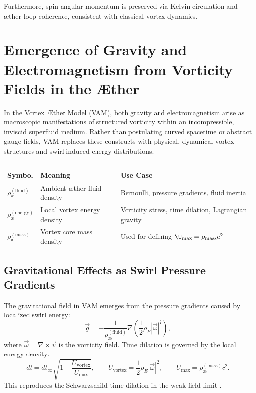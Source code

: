 \documentclass[preprint]{revtex4-2}
\begin{document}
Furthermore, spin angular momentum is preserved via Kelvin circulation and \ae ther loop coherence, consistent with classical vortex dynamics.

\section{Emergence of Gravity and Electromagnetism from Vorticity Fields in the Æther}

In the Vortex \AE ther Model (VAM), both gravity and electromagnetism arise as macroscopic manifestations of structured vorticity within an incompressible, inviscid superfluid medium. Rather than postulating curved spacetime or abstract gauge fields, VAM replaces these constructs with physical, dynamical vortex structures and swirl-induced energy distributions.


\begin{table}
    \centering
    \begin{tabular}{lll}
        \toprule
        \textbf{Symbol} & \textbf{Meaning} & \textbf{Use Case} \\
        \midrule
          \(\rho_\text{\ae}^{(\text{fluid})}\) & Ambient æther fluid density & Bernoulli, pressure gradients, fluid inertia \\
          \(\rho_\text{\ae}^{(\text{energy})}\) & Local vortex energy density & Vorticity stress, time dilation, Lagrangian gravity \\
          \(\rho_\text{\ae}^{(\text{mass})}\) & Vortex core mass density & Used for defining \(\U_{\text{max}} = \rho_\text{mass} c^2\) \\
        \bottomrule
    \end{tabular}
    \caption{}
    \label{tab:densities}
\end{table}

\subsection{Gravitational Effects as Swirl Pressure Gradients}

The gravitational field in VAM emerges from the pressure gradients caused by localized swirl energy:
\begin{equation}
\vec{g} = -\frac{1}{\rho_\text{\ae}^{(\text{fluid})}} \nabla \left( \frac{1}{2} \rho_{\scriptscriptstyle\boldsymbol\!E}|\vec{\omega}|^2 \right),
\end{equation}
where \( \vec{\omega} = \nabla \times \vec{v} \) is the vorticity field. Time dilation is governed by the local energy density:
\begin{equation}
dt = dt_\infty \sqrt{1 - \frac{U_{\text{vortex}}}{U_{\text{max}}}}, \qquad
U_{\text{vortex}} = \frac{1}{2} \rho_{\scriptscriptstyle\boldsymbol\!E}|\vec{\omega}|^2, \qquad
U_{\text{max}} = \rho_\text{\ae}^{(\text{mass})} c^2.
\end{equation}
This reproduces the Schwarzschild time dilation in the weak-field limit \cite{MTW1973}.
\end{document}
